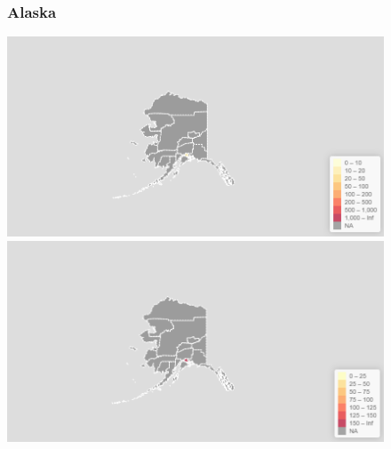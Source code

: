 \documentclass[11pt]{article}
\begin{document}
\def\fillandplacepagenumber{%
 \par\pagestyle{empty}%
 \vbox to 0pt{\vss}\vfill
 \vbox to 0pt{\baselineskip0pt
   \hbox to\linewidth{\hss}%
   \baselineskip\footskip
   \hbox to\linewidth{%
     \hfil\thepage\hfil}\vss}}

\begin{landscape}
\thispagestyle{empty}
\begin{figure}[h]
\subsubsection*{Alaska}
\hspace*{-3cm}
\begin{minipage}{.8\textwidth}
    \includegraphics[width=.95\textwidth]{ImageResults/AlaskaTotal.PNG}
\end{minipage}%
\begin{minipage}{.8\textwidth}
    \includegraphics[width=.95\textwidth]{ImageResults/Alaska100k.PNG}
\end{minipage}

\end{figure}
\end{landscape}
\end{document}
